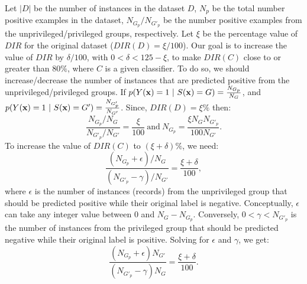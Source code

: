 Let $|D|$ be the number of instances in the dataset $D$, $N_p$ %
be the total number positive examples in the dataset, $N_{G_p}/N_{G'_p}$ %
be the number positive examples from the unprivileged/privileged groups, respectively. Let $\xi$ be the percentage value of $DIR$ for the original dataset ($DIR(D) = \xi/100$). Our goal is to increase the value of $DIR$ by $\delta/100$, with $0 < \delta < 125 - \xi $, to make $DIR(C)$ close to or greater than $80\%$, where $C$ is a given classifier. To do so, we should increase/decrease the number of instances that are predicted positive from the unprivileged/privileged groups. If $p(Y({\bf x}) = 1\ |\ S({\bf x}) = G) = \frac{N_{G_p}}{N_G}$, and $p(Y({\bf x}) = 1\ |\ S({\bf x}) = G') = \frac{N_{G'_p}}{N_{G'}}$. 
Since, $DIR(D) = \xi\%$ then: 
\begin{equation} \label{eq:NGP}
\frac{N_{G_p}/{N_G}}{N_{G'_p}/{N_{G'}}} = \frac{\xi}{100}\ \text{and}\ N_{G_p} = \frac{\xi N_G N_{G'_p}}{100N_{G'}}.
\end{equation}
To increase the value of $DIR(C)$ to $(\xi+\delta)\%$, we need:
\begin{equation}\label{eq:general}
\frac{\left(N_{G_p}+\epsilon\right)/{N_G}}{\left(N_{G'_p}-\gamma\right)/{N_{G'}}} = \frac{\xi+\delta}{100},
\end{equation}
where $\epsilon$ is the number of instances (records) from the unprivileged group that should be predicted positive while their original label is negative. 
Conceptually, $\epsilon$ can take any integer value between $0$ and $N_G - N_{G_p}$.
Conversely, $0 < \gamma < N_{G'_p}$ is the number of instances from the privileged group that should be predicted negative while their original label is positive. 
Solving for $\epsilon$ and $\gamma$, we get:
\begin{equation} \label{eq:compute_eps_gam}
    \frac{\left(N_{G_p}+\epsilon\right){N_{G'}}}{\left(N_{G'_p}-\gamma\right){N_{G}}} = \frac{\xi+\delta}{100}.
\end{equation}

